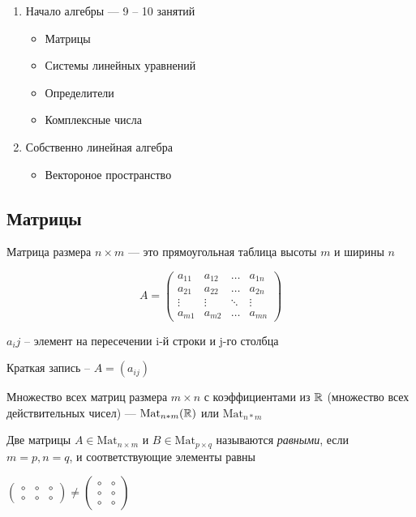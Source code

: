 \begin{enumerate}
	\item Начало алгебры --- 9 -- 10 занятий
	
	\begin{itemize}[nosep]
		\item Матрицы
		\item Системы линейных уравнений
		\item Определители
		\item Комплексные числа
	\end{itemize}

	\item Собственно линейная алгебра
	\begin{itemize}
		\item Вектороное пространство
	\end{itemize}
\end{enumerate}

\subsection{Матрицы}
\begin{definition}
	Матрица размера \( n \times m \) --- это прямоугольная таблица высоты \( m \) и ширины \( n \)
\end{definition}
\[ 
	A = 
	\begin{pmatrix}
		a_{11}  & a_{12} & \dots & a_{1n} \\
		a_{21} & a_{22} & \dots & a_{2n} \\
		\vdots & \vdots & \ddots & \vdots \\
		a_{m1} & a_{m2} & \dots & a_{mn}
	\end{pmatrix}
\]

\(a_ij\) -- элемент на пересечении i-й строки и j-го столбца

Краткая запись -- \( A = (a_{ij}) \)

Множество всех матриц размера \(m \times n \) с коэффициентами из \( \mathbb{R} \) (множество всех действительных чисел) --- \( \text{Mat}_{n*m}(\mathbb{R}) \) или \( \text{Mat}_{n*m} \)

\begin{definition}
	Две матрицы \( A \in \text{Mat}_{n \times m} \) и \( B \in \text{Mat}_{p \times q} \) называются \textit{равными}, если \( m = p, n = q \), и соответствующие элементы равны
\end{definition}

\begin{example}
	\(
		\begin{pmatrix}
			\circ & \circ & \circ \\ \circ & \circ & \circ
		\end{pmatrix}
		\neq
		\begin{pmatrix}
			\circ & \circ \\ \circ & \circ \\ \circ & \circ
		\end{pmatrix}
	\)
\end{example}

